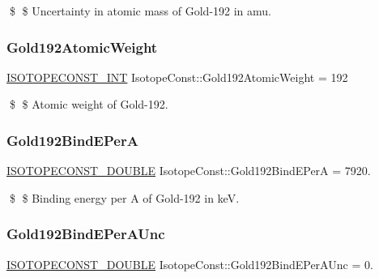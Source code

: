 \$ \$ Uncertainty in atomic mass of Gold-\/192 in amu. \mbox{\label{group___isotope_const-_gold-_au192_gad616e8b631beff61d65db1d896b7824d}} 
\subsubsection{\texorpdfstring{Gold192\+Atomic\+Weight}{Gold192AtomicWeight}}
{\footnotesize\ttfamily \mbox{\hyperlink{group___isotope_const-_macros_ga5f18360b3e99483a35c32d789e62621c}{I\+S\+O\+T\+O\+P\+E\+C\+O\+N\+S\+T\+\_\+\+I\+NT}} Isotope\+Const\+::\+Gold192\+Atomic\+Weight = 192}

\$ \$ Atomic weight of Gold-\/192. \mbox{\label{group___isotope_const-_gold-_au192_ga7b56fe91c3b5359b1eca72fb48429fa6}} 
\subsubsection{\texorpdfstring{Gold192\+Bind\+E\+PerA}{Gold192BindEPerA}}
{\footnotesize\ttfamily \mbox{\hyperlink{group___isotope_const-_macros_ga8f45a7272ce02c0b4c65c44636ed719a}{I\+S\+O\+T\+O\+P\+E\+C\+O\+N\+S\+T\+\_\+\+D\+O\+U\+B\+LE}} Isotope\+Const\+::\+Gold192\+Bind\+E\+PerA = 7920.}

\$ \$ Binding energy per A of Gold-\/192 in keV. \mbox{\label{group___isotope_const-_gold-_au192_gaba1601f8a39bef92b48d88a962008b02}} 
\subsubsection{\texorpdfstring{Gold192\+Bind\+E\+Per\+A\+Unc}{Gold192BindEPerAUnc}}
{\footnotesize\ttfamily \mbox{\hyperlink{group___isotope_const-_macros_ga8f45a7272ce02c0b4c65c44636ed719a}{I\+S\+O\+T\+O\+P\+E\+C\+O\+N\+S\+T\+\_\+\+D\+O\+U\+B\+LE}} Isotope\+Const\+::\+Gold192\+Bind\+E\+Per\+A\+Unc = 0.}

